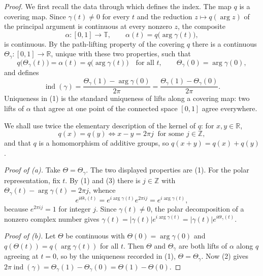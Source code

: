 \begin{proof}
We first recall the data through which  defines the
index.  The map $q$ is a covering map.  Since $\gamma(t)\neq0$ for every $t$ and
the reduction $z\mapsto q(\arg z)$ of the principal argument is continuous at
every nonzero $z$, the composite
\[
  \alpha\colon[0,1]\to\mathbb{T},\qquad \alpha(t)=q\bigl(\arg\gamma(t)\bigr),
\]
is continuous.  By the path-lifting property of the covering $q$ there is a
continuous $\Theta_\gamma\colon[0,1]\to\mathbb{R}$, unique with these two
properties, such that
\begin{equation}\tag{1}
  q\bigl(\Theta_\gamma(t)\bigr)=\alpha(t)=q\bigl(\arg\gamma(t)\bigr)\quad\text{for all }t,
  \qquad \Theta_\gamma(0)=\arg\gamma(0),
\end{equation}
and  defines
\begin{equation}\tag{2}
  \operatorname{ind}(\gamma)=\frac{\Theta_\gamma(1)-\arg\gamma(0)}{2\pi}
  =\frac{\Theta_\gamma(1)-\Theta_\gamma(0)}{2\pi}.
\end{equation}
Uniqueness in (1) is the standard uniqueness of lifts along a covering map: two
lifts of $\alpha$ that agree at one point of the connected space $[0,1]$ agree
everywhere.

We shall use twice the elementary description of the kernel of $q$: for
$x,y\in\mathbb{R}$,
\begin{equation}\tag{3}
  q(x)=q(y)\iff x-y=2\pi j\ \text{ for some }j\in\mathbb{Z},
\end{equation}
and that $q$ is a homomorphism of additive groups, so $q(x+y)=q(x)+q(y)$.

\emph{Proof of (a).}  Take $\Theta=\Theta_\gamma$.  The two displayed
properties are (1).  For the polar representation, fix $t$.  By (1) and (3)
there is $j\in\mathbb{Z}$ with $\Theta_\gamma(t)-\arg\gamma(t)=2\pi j$, whence
\[
  e^{i\Theta_\gamma(t)}=e^{i\arg\gamma(t)}e^{2\pi ij}=e^{i\arg\gamma(t)},
\]
because $e^{2\pi ij}=1$ for integer $j$.  Since $\gamma(t)\neq0$, the polar
decomposition of a nonzero complex number gives
$\gamma(t)=|\gamma(t)|e^{i\arg\gamma(t)}=|\gamma(t)|e^{i\Theta_\gamma(t)}$.

\emph{Proof of (b).}  Let $\Theta$ be continuous with $\Theta(0)=\arg\gamma(0)$
and $q(\Theta(t))=q(\arg\gamma(t))$ for all $t$.  Then $\Theta$ and
$\Theta_\gamma$ are both lifts of $\alpha$ along $q$ agreeing at $t=0$, so by
the uniqueness recorded in (1), $\Theta=\Theta_\gamma$.  Now (2) gives
$2\pi\operatorname{ind}(\gamma)=\Theta_\gamma(1)-\Theta_\gamma(0)=\Theta(1)-\Theta(0)$.


\end{proof}
